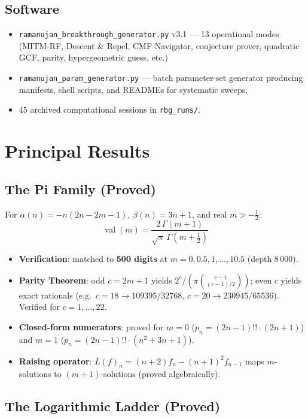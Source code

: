 \documentclass[11pt,a4paper]{article}
\begin{document}
\subsection{Software}
\begin{itemize}
\item \texttt{ramanujan\_breakthrough\_generator.py} v3.1 — 13 operational modes (MITM-RF, Descent \& Repel, CMF Navigator, conjecture prover, quadratic GCF, parity, hypergeometric guess, etc.)
\item \texttt{ramanujan\_param\_generator.py} — batch parameter-set generator producing manifests, shell scripts, and READMEs for systematic sweeps.
\item 45 archived computational sessions in \texttt{rbg\_runs/}.
\end{itemize}

\section{Principal Results}

\subsection{The Pi Family (Proved)}

For $\alpha(n) = -n(2n - 2m - 1)$, $\beta(n) = 3n + 1$, and real $m > -\tfrac{1}{2}$:
\[
  \boxed{
    \operatorname{val}(m) = \frac{2\,\Gamma(m+1)}{\sqrt{\pi}\,\Gamma(m + \tfrac{1}{2})}
  }
\]
\begin{itemize}
\item \textbf{Verification}: matched to \textbf{500 digits} at $m = 0, 0.5, 1, \ldots, 10.5$ (depth 8\,000).
\item \textbf{Parity Theorem}: odd $c = 2m+1$ yields $2^{c}/(\pi\binom{c-1}{(c-1)/2})$; even $c$ yields exact rationals (e.g.\ $c = 18 \to 109395/32768$, $c = 20 \to 230945/65536$).  Verified for $c = 1, \ldots, 22$.
\item \textbf{Closed-form numerators}: proved for $m = 0$ ($p_n = (2n-1)!!\cdot(2n+1)$) and $m = 1$ ($p_n = (2n-1)!!\cdot(n^2+3n+1)$).
\item \textbf{Raising operator}: $L(f)_n = (n+2)f_n - (n+1)^2 f_{n-1}$ maps $m$-solutions to $(m{+}1)$-solutions (proved algebraically).
\end{itemize}

\subsection{The Logarithmic Ladder (Proved)}
\end{document}
